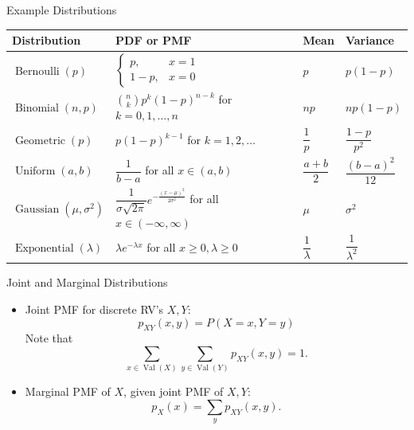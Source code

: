 \documentclass[aspectratio=169,12pt]{beamer}
\DeclareMathOperator{\Val}{Val}
\begin{document}
\begin{frame}[t]{Example Distributions}
  \vspace{-0.16cm}
  \centering
  {\fontsize{7.7}{9.3}\selectfont
  \renewcommand{\arraystretch}{1.38}
  \begin{tabular}{>{\raggedright\arraybackslash}p{2.35cm}
                  >{\centering\arraybackslash}p{6.20cm}
                  >{\centering\arraybackslash}p{1.45cm}
                  >{\centering\arraybackslash}p{1.65cm}}
    \toprule
    \textbf{Distribution} & \textbf{PDF or PMF} & \textbf{Mean} & \textbf{Variance}\\
    \midrule
    $\operatorname{Bernoulli}(p)$ &
      $\begin{cases}p,&x=1\\1-p,&x=0\end{cases}$ &
      $p$ & $p(1-p)$\\
    $\operatorname{Binomial}(n,p)$ &
      $\binom{n}{k}p^k(1-p)^{n-k}$ for $k=0,1,\ldots,n$ &
      $np$ & $np(1-p)$\\
    $\operatorname{Geometric}(p)$ &
      $p(1-p)^{k-1}$ for $k=1,2,\ldots$ &
      $\dfrac{1}{p}$ & $\dfrac{1-p}{p^2}$\\
    $\operatorname{Uniform}(a,b)$ &
      $\dfrac{1}{b-a}$ for all $x\in(a,b)$ &
      $\dfrac{a+b}{2}$ & $\dfrac{(b-a)^2}{12}$\\
    $\operatorname{Gaussian}(\mu,\sigma^2)$ &
      $\dfrac{1}{\sigma\sqrt{2\pi}}e^{-\frac{(x-\mu)^2}{2\sigma^2}}$
      for all $x\in(-\infty,\infty)$ &
      $\mu$ & $\sigma^2$\\
    $\operatorname{Exponential}(\lambda)$ &
      $\lambda e^{-\lambda x}$ for all $x\ge0,\lambda\ge0$ &
      $\dfrac{1}{\lambda}$ & $\dfrac{1}{\lambda^2}$\\
    \bottomrule
  \end{tabular}
  }
\end{frame}

\begin{frame}[t]{Joint and Marginal Distributions}
  \vspace{0.18cm}
  {\small
  \begin{itemize}
    \setlength{\itemsep}{0.22cm}
    \item Joint PMF for discrete RV's $X,Y$:
      \[
        p_{XY}(x,y)=P(X=x,Y=y)
      \]
      Note that
      \[
        \sum_{x\in\Val(X)}\sum_{y\in\Val(Y)}p_{XY}(x,y)=1.
      \]
    \item Marginal PMF of $X$, given joint PMF of $X,Y$:
      \[
        p_X(x)=\sum_y p_{XY}(x,y).
      \]
  \end{itemize}
  }
\end{frame}
\end{document}
